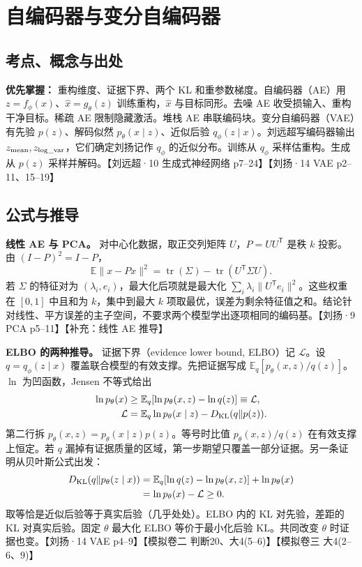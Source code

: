 \documentclass[UTF8,a4paper,zihao=-4,fontset=fandol]{ctexart}
\begin{document}
\section{自编码器与变分自编码器}
\subsection{考点、概念与出处}

\textbf{优先掌握：} 重构维度、证据下界、两个 KL 和重参数梯度。自编码器（AE）用 $z=f_\phi(x)$、$\hat x=g_\theta(z)$ 训练重构，$\hat x$ 与目标同形。去噪 AE 收受损输入、重构干净目标。稀疏 AE 限制隐藏激活。堆栈 AE 串联编码块。变分自编码器（VAE）有先验 $p(z)$、解码似然 $p_\theta(x\mid z)$、近似后验 $q_\phi(z\mid x)$。刘远超写编码器输出 $z_{\rm mean},z_{\rm log\_var}$，它们确定刘扬记作 $q_\phi$ 的近似分布。训练从 $q_\phi$ 采样估重构。生成从 $p(z)$ 采样并解码。【刘远超·10 生成式神经网络 p7--24】【刘扬·14 VAE p2--11、15--19】

\subsection{公式与推导}

\textbf{线性 AE 与 PCA。} 对中心化数据，取正交列矩阵 $U$，$P=UU^{\mathsf T}$ 是秩 $k$ 投影。由 $(I-P)^2=I-P$，
\[
 \mathbb E\|x-Px\|^2
 =\operatorname{tr}(\Sigma)-\operatorname{tr}(U^{\mathsf T}\Sigma U).
\]
若 $\Sigma$ 的特征对为 $(\lambda_i,e_i)$，最大化后项就是最大化 $\sum_i\lambda_i\|U^{\mathsf T}e_i\|^2$。这些权重在 $[0,1]$ 中且和为 $k$，集中到最大 $k$ 项取最优，误差为剩余特征值之和。结论针对线性、平方误差的主子空间，不要求两个模型学出逐项相同的编码基。【刘扬·9 PCA p5--11】【补充：线性 AE 推导】

\textbf{ELBO 的两种推导。} 证据下界（evidence lower bound, ELBO）记 $\mathcal L$。设 $q=q_\phi(z\mid x)$ 覆盖联合模型的有效支撑。先把证据写成 $\mathbb E_q[p_\theta(x,z)/q(z)]$。$\ln$ 为凹函数，Jensen 不等式给出
\begin{align*}
 \ln p_\theta(x)&\ge
 \mathbb E_q[\ln p_\theta(x,z)-\ln q(z)]\equiv\mathcal L,\\
 \mathcal L&=\mathbb E_q\ln p_\theta(x\mid z)
       -D_{\rm KL}(q\|p(z)).
\end{align*}
第二行拆 $p_\theta(x,z)=p_\theta(x\mid z)p(z)$。等号时比值 $p_\theta(x,z)/q(z)$ 在有效支撑上恒定。若 $q$ 漏掉有证据质量的区域，第一步期望只覆盖一部分证据。另一条证明从贝叶斯公式出发：
\begin{align*}
 D_{\rm KL}(q\|p_\theta(z\mid x))
 &=\mathbb E_q[\ln q(z)-\ln p_\theta(x,z)]+\ln p_\theta(x)\\
 &=\ln p_\theta(x)-\mathcal L\ge0.
\end{align*}
取等恰是近似后验等于真实后验（几乎处处）。ELBO 内的 KL 对先验，差距的 KL 对真实后验。固定 $\theta$ 最大化 ELBO 等价于最小化后验 KL。共同改变 $\theta$ 时证据也变。【刘扬·14 VAE p4--9】【模拟卷二 判断20、大4(5--6)】【模拟卷三 大4(2--6、9)】
\end{document}
